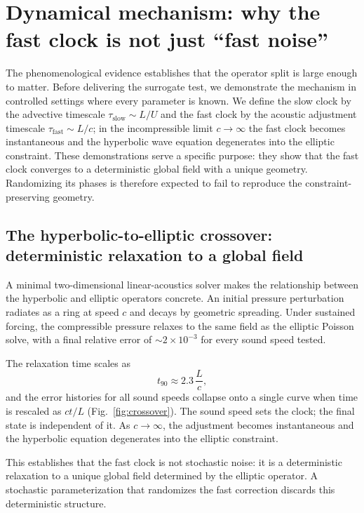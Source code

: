 \documentclass[11pt]{article}
\begin{document}
\section{Dynamical mechanism: why the fast clock is not just ``fast noise''}
\label{sec:mechanism}

The phenomenological evidence establishes that the operator split is large enough to matter. Before delivering the surrogate test, we demonstrate the mechanism in controlled settings where every parameter is known. We define the slow clock by the advective timescale $\tau_{\mathrm{slow}} \sim L/U$ and the fast clock by the acoustic adjustment timescale $\tau_{\mathrm{fast}} \sim L/c$; in the incompressible limit $c \to \infty$ the fast clock becomes instantaneous and the hyperbolic wave equation degenerates into the elliptic constraint. These demonstrations serve a specific purpose: they show that the fast clock converges to a deterministic global field with a unique geometry. Randomizing its phases is therefore expected to fail to reproduce the constraint-preserving geometry.

\subsection{The hyperbolic-to-elliptic crossover: deterministic relaxation to a global field}
\label{sec:crossover}

A minimal two-dimensional linear-acoustics solver makes the relationship between the hyperbolic and elliptic operators concrete. An initial pressure perturbation radiates as a ring at speed $c$ and decays by geometric spreading. Under sustained forcing, the compressible pressure relaxes to the same field as the elliptic Poisson solve, with a final relative error of $\sim 2\times 10^{-3}$ for every sound speed tested.

The relaxation time scales as
\begin{equation}
t_{90} \approx 2.3\,\frac{L}{c},
\label{eq:crossover}
\end{equation}
and the error histories for all sound speeds collapse onto a single curve when time is rescaled as $ct/L$ (Fig.~\ref{fig:crossover}). The sound speed sets the clock; the final state is independent of it. As $c \to \infty$, the adjustment becomes instantaneous and the hyperbolic equation degenerates into the elliptic constraint.

This establishes that the fast clock is not stochastic noise: it is a deterministic relaxation to a unique global field determined by the elliptic operator. A stochastic parameterization that randomizes the fast correction discards this deterministic structure.
\end{document}
